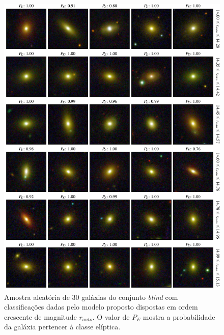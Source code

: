 \begin{figure}[!ht]
  \centering
  \includegraphics[width=0.95\linewidth]{figures/blind_preds_ellip_1.pdf}
  \caption{Amostra aleatória de 30 galáxias do conjunto \emph{blind} com classificações dadas pelo modelo proposto dispostas em ordem crescente de magnitude $r_{auto}$. O valor de $P_E$ mostra a probabilidade da galáxia pertencer à classe elíptica.}
  \label{fig:grid-e1}
\end{figure}

